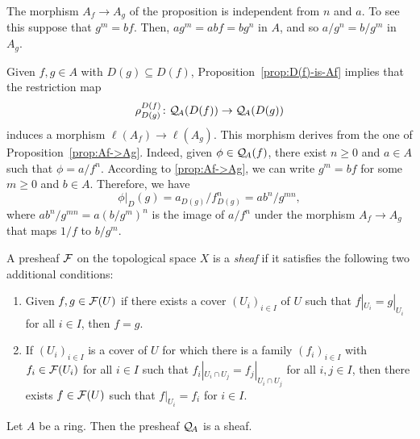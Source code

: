 \begin{rem}
    The morphism $A_f\to A_g$ of the proposition is independent from $n$ and $a$. To see this suppose that $g^m=bf$. Then, $ag^m=abf=bg^n$ in $A$, and so $a/g^n=b/g^m$ in $A_g$.
\end{rem}

\begin{rem}\label{rem:basic-restrictions-equal-Af->Ag}
    Given $f,g\in A$ with $D(g)\subseteq D(f)$, Proposition~\ref{prop:D(f)-is-Af} implies that the restriction map
    $$
        \rho^{D(f)}_{D(g)}\colon\mathcal Q_{\!A}(D(f))\to\mathcal Q_{\!A}(D(g))
    $$
    induces a morphism $\ell(A_f)\to\ell(A_g)$. This morphism derives from the one of Proposition~\ref{prop:Af->Ag}. Indeed, given $\phi\in\mathcal Q_{\!A}(f)$, there exist $n\ge0$ and $a\in A$ such that $\phi=a/f^n$. According to \ref{prop:Af->Ag}, we can write $g^m=bf$ for some $m\ge0$ and $b\in A$. Therefore, we have
    $$
        \phi|_D(g)=a_{D(g)}/f^n_{D(g)}=ab^n/g^{mn},
    $$
    where $ab^n/g^{mn}=a(b/g^m)^n$ is the image of $a/f^n$ under the morphism $A_f\to A_g$ that maps $1/f$ to $b/g^m$.
\end{rem}
\begin{defn}\label{defn:sheaf}
    A presheaf $\mathcal{F}$ on the topological space $X$ is a \textsl{sheaf} if it satisfies the following two additional conditions:
    \begin{enumerate}[\rm a)]
        \item Given $f,g\in\mathcal{F}(U)$ if there exists a cover $(U_i)_{i\in I}$ of $U$ such that $f|_{U_i}=g|_{U_i}$ for all $i\in I$, then $f=g$.

        \item If $(U_i)_{i\in I}$ is a cover of $U$ for which there is a family $(f_i)_{i\in I}$ with $f_i\in\mathcal{F}(U_i)$ for all $i\in I$ such that $f_i|_{U_i\cap U_j}=f_j|_{U_i\cap U_j}$ for all $i,j\in I$, then there exists $f\in\mathcal{F}(U)$ such that $f|_{U_i}=f_i$ for $i\in I$.
    \end{enumerate}
\end{defn}


\begin{thm}
    Let\/ $A$ be a ring. Then the presheaf\/ $\mathcal Q_{\!A}$ is a sheaf.
\end{thm}

